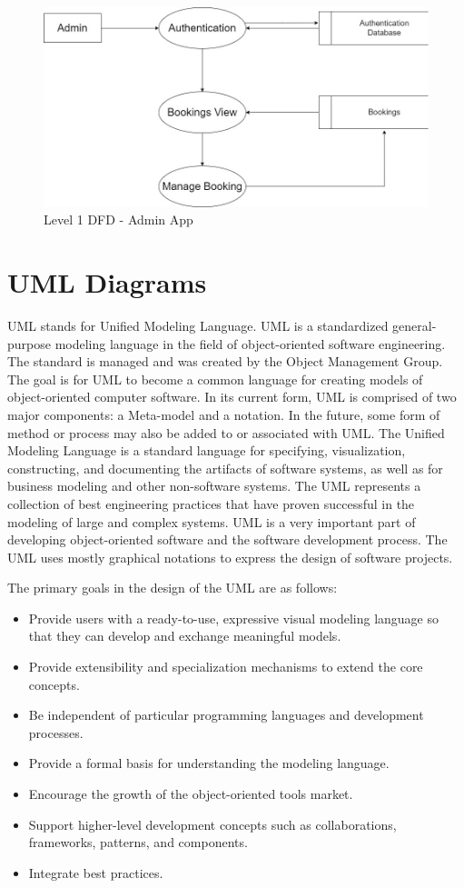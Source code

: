 \documentclass[12pt,a4paper]{report}
\begin{document}
\begin{figure}
    \centering
    \includegraphics[width=\textwidth]{assets/DFD-2-Admin.jpg}
    \caption{Level 1 DFD - Admin App}
    \label{dfd-2-admin}
\end{figure}
\clearpage

\section{UML Diagrams}
UML stands for Unified Modeling Language. UML is a standardized general-purpose modeling language in the field of object-oriented software engineering. The standard is managed and was created by the Object Management Group. The goal is for UML to become a common language for creating models of object-oriented computer software. In its current form, UML is comprised of two major components: a Meta-model and a notation. In the future, some form of method or process may also be added to or associated with UML.
The Unified Modeling Language is a standard language for specifying, visualization, constructing, and documenting the artifacts of software systems, as well as for business modeling and other non-software systems. The UML represents a collection of best engineering practices that have proven successful in the modeling of large and complex systems. UML is a very important part of developing object-oriented software and the software development process. The UML uses mostly graphical notations to express the design of software projects.

The primary goals in the design of the UML are as follows:
\begin{itemize}
    \item Provide users with a ready-to-use, expressive visual modeling language so that they can develop and exchange meaningful models.
    \item Provide extensibility and specialization mechanisms to extend the core concepts.
    \item Be independent of particular programming languages and development processes.
    \item Provide a formal basis for understanding the modeling language.
    \item Encourage the growth of the object-oriented tools market.
    \item Support higher-level development concepts such as collaborations, frameworks, patterns, and components.
    \item Integrate best practices.
\end{itemize}
\end{document}
